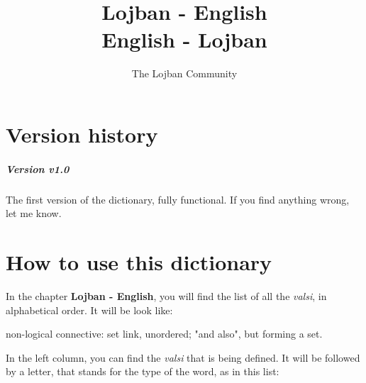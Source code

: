 \documentclass[ipa,twoside]{report}
\author{The Lojban Community}
\title{Lojban - English\\English - Lojban}
\begin{document}
\setlength{\leftfield}{0.15\textwidth}
\setlength{\rightfield}{0.3\textwidth}


\maketitle

\tableofcontents


\chapter*{Version history}
\label{cha:history}
\paragraph*{Version v1.0}

The first version of the dictionary, fully functional. If you find anything wrong, let me know.


\chapter*{How to use this dictionary}
\label{cha:howto}
In the chapter \textbf{Lojban - English}, you will find the list of all the \textsl{valsi}, in alphabetical order. It will be look like:

\begin{center}
\begin{minipage}[t]{0.55\textwidth}
 	{}{}{}{non-logical connective: set link, unordered; "and also", but forming a set.}
\end{minipage}
\end{center}

In the left column, you can find the \textsl{valsi} that is being defined. It will be followed by a letter, that stands for the type of the word, as in this list:
\end{document}
